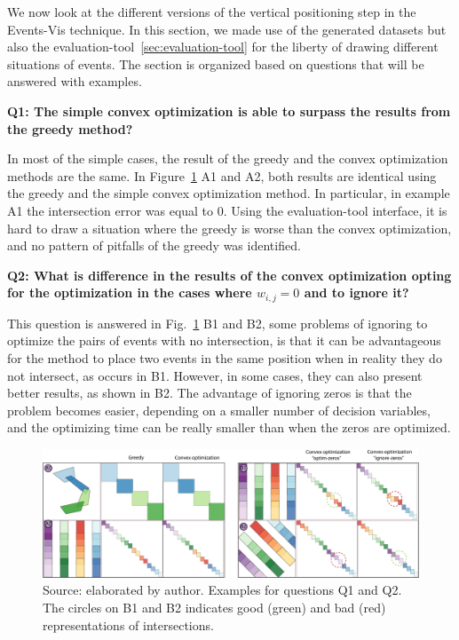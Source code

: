We now look at the different versions of the vertical positioning step in the Events-Vis technique.
%
In this section, we made use of the generated datasets but also the evaluation-tool~\ref{sec:evaluation-tool} for the liberty of drawing different situations of events.
%
The section is organized based on questions that will be answered with examples. 

\textbf{Q1: The simple convex optimization is able to surpass the results from the greedy method?}

In most of the simple cases, the result of the greedy and the convex optimization methods are the same. In Figure~\ref{fig:vert-pos-alg1} A1 and A2, both results are identical using the greedy and the simple convex optimization method. In particular, in example A1 the intersection error was equal to 0.
%
Using the evaluation-tool interface, it is hard to draw a situation where the greedy is worse than the convex optimization, and no pattern of pitfalls of the greedy was identified.

\textbf{Q2: What is difference in the results of the convex optimization opting for the optimization in the cases where $w_{i, j} = 0$ and to ignore it?}

This question is answered in Fig.~\ref{fig:vert-pos-alg1} B1 and B2, some problems of ignoring to optimize the pairs of events with no intersection, is that it can be advantageous for the method to place two events in the same position when in reality they do not intersect, as occurs in B1.
%
However, in some cases, they can also present better results, as shown in B2.
%
The advantage of ignoring zeros is that the problem becomes easier, depending on a smaller number of decision variables, and the optimizing time can be really smaller than when the zeros are optimized.

\begin{figure}
    \centering
    \includegraphics[width = \linewidth]{src/imgs/vert-pos-alg1.pdf}
    \caption{Source: elaborated by author. Examples for questions Q1 and Q2. The circles on B1 and B2 indicates good (green) and bad (red) representations of intersections.}
    \label{fig:vert-pos-alg1}
\end{figure}

